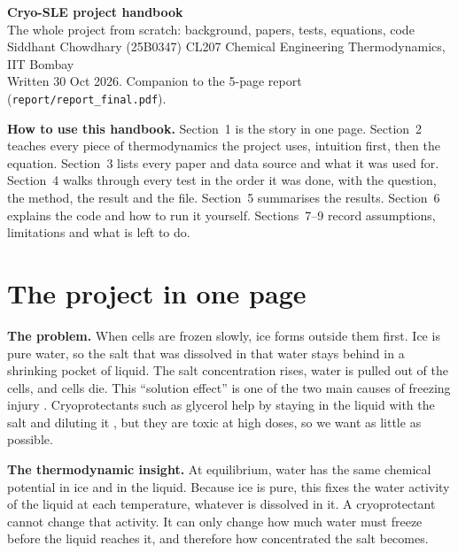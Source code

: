 \documentclass[11pt,a4paper]{article}
\newcommand{\file}[1]{\texttt{\small #1}}
\begin{document}
\begin{center}
{\LARGE\bfseries Cryo-SLE project handbook}\\[6pt]
{\large The whole project from scratch: background, papers, tests, equations, code}\\[6pt]
{\normalsize Siddhant Chowdhary (25B0347) \quad CL207 Chemical Engineering Thermodynamics, IIT Bombay}\\[2pt]
{\small\color{mid}Written 30 Oct 2026. Companion to the 5-page report (\file{report/report\_final.pdf}).}
\end{center}

\begin{idea}
\textbf{How to use this handbook.} Section~1 is the story in one page. Section~2 teaches every piece of
thermodynamics the project uses, intuition first, then the equation. Section~3 lists every paper and data source
and what it was used for. Section~4 walks through every test in the order it was done, with the question, the
method, the result and the file. Section~5 summarises the results. Section~6 explains the code and how to run it
yourself. Sections~7--9 record assumptions, limitations and what is left to do.
\end{idea}

\tableofcontents
\clearpage

\section{The project in one page}

\textbf{The problem.} When cells are frozen slowly, ice forms outside them first. Ice is pure water, so the salt
that was dissolved in that water stays behind in a shrinking pocket of liquid. The salt concentration rises, water
is pulled out of the cells, and cells die. This ``solution effect'' is one of the two main causes of freezing
injury \cite{mazur}. Cryoprotectants such as glycerol help by staying in the liquid with the salt and diluting it
\cite{lovelock11}, but they are toxic at high doses, so we want as little as possible.

\textbf{The thermodynamic insight.} At equilibrium, water has the same chemical potential in ice and in the liquid.
Because ice is pure, this fixes the water activity of the liquid at each temperature, whatever is dissolved in it.
A cryoprotectant cannot change that activity. It can only change how much water must freeze before the liquid
reaches it, and therefore how concentrated the salt becomes.
\end{document}
